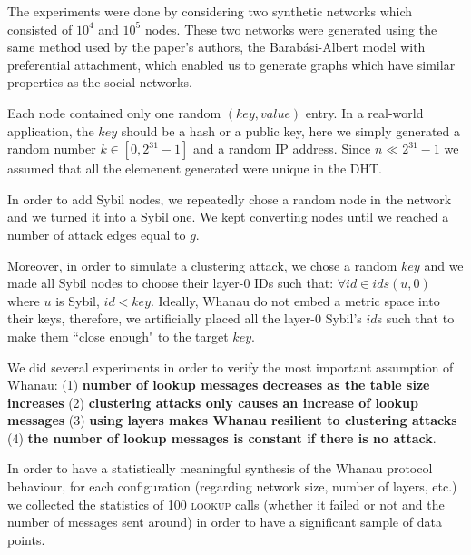 The experiments were done by considering two synthetic networks which consisted of $10^4$ and $10^5$ nodes. These two networks were generated using the same method used by the paper's authors, the Barabási-Albert model with preferential attachment, which enabled us to generate graphs which have similar properties as the social networks.

Each node contained only one random $(key, value)$ entry. In a real-world application, the $key$ should be a hash or a public key, here we simply generated a random number $k \in [0, 2^{31}-1]$ and a random IP address. 
Since $n \ll 2^{31}-1$ we assumed that all the elemenent generated were unique in the DHT.

In order to add Sybil nodes, we repeatedly chose a random node in the network and we turned it into a Sybil one. We kept converting nodes until we reached a number of attack edges equal to $g$.

Moreover, in order to simulate a clustering attack, we chose a random $key$ and we made all Sybil nodes to choose their layer-0 IDs such that: 
$\forall id \in ids(u, 0)$ where $u$ is Sybil, $id < key$. Ideally, Whanau do not embed a metric space into their keys, therefore, we artificially placed all the layer-0 Sybil's $id$s such that to make them ``close enough" to the target $key$.

We did several experiments in order to verify the most important assumption of Whanau: (1) \textbf{number of lookup messages decreases as the table size increases} (2) \textbf{clustering attacks only causes an increase of lookup messages} (3) \textbf{using layers makes Whanau resilient to clustering attacks} (4) \textbf{the number of lookup messages is constant if there is no attack}.

In order to have a statistically meaningful synthesis of the Whanau protocol behaviour, for each configuration (regarding network size, number of layers, etc.) we collected the statistics of 100 \textsc{lookup} calls (whether it failed or not and the number of messages sent around) in order to have a significant sample of data points.

